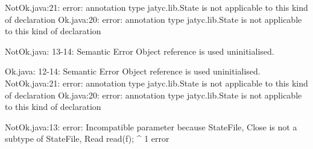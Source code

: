 \lstset{language=,caption=Mungo's output}
\begin{code}
NotOk.java:21: error: annotation type jatyc.lib.State is not applicable to this kind of declaration
Ok.java:20: error: annotation type jatyc.lib.State is not applicable to this kind of declaration

NotOk.java: 13-14: Semantic Error
		Object reference is used uninitialised.

Ok.java: 12-14: Semantic Error
		Object reference is used uninitialised.
NotOk.java:21: error: annotation type jatyc.lib.State is not applicable to this kind of declaration
Ok.java:20: error: annotation type jatyc.lib.State is not applicable to this kind of declaration
\end{code}

\lstset{language=,caption=Our tool's output}
\begin{code}
NotOk.java:13: error: Incompatible parameter because State{File, Close} is not a subtype of State{File, Read}
        read(f);
             ^
1 error
\end{code}


